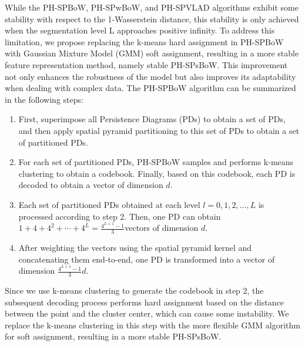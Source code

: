 \documentclass[5GeSdc,ASOC,numref,printGA,printHL,CASflow,nocrossmark,longtitle,PROOF]{/usr/local/texlive/iTemplates/01-Templates/01-Els-Jnl/01-Standard_Templates/V1/ELS_MDL5-V1-6}
\begin{document}
\begin{articlestyle}
While the PH-SPBoW, PH-SPwBoW, and PH-SPVLAD algorithms exhibit some stability with respect to the 1-Wasserstein distance, this stability is only achieved when the segmentation level L approaches positive infinity. To address this limitation, we propose replacing the k-means hard assignment in PH-SPBoW with Gaussian Mixture Model (GMM) soft assignment, resulting in a more stable feature representation method, namely stable PH-SPsBoW. This improvement not only enhances the robustness of the model but also improves its adaptability when dealing with complex data.
The PH-SPBoW algorithm can be summarized in the following steps:
\begin{enumerate}  
	\item[Step 1:~] First, superimpose all Persistence Diagrams (PDs) to obtain a set of PDs, and then apply spatial pyramid partitioning to this set of PDs to obtain a set of partitioned PDs.  
	
	\item[Step 2:~] For each set of partitioned PDs, PH-SPBoW samples and performs k-means clustering to obtain a codebook. Finally, based on this codebook, each PD is decoded to obtain a vector of dimension $ d $.  
	
	\item[Step 3:~] Each set of partitioned PDs obtained at each level $ l = 0, 1, 2, \ldots, L $ is processed according to step 2. Then, one PD can obtain $  1 + 4 + 4^2 +\cdots+ 4^L = \frac{4^{L+1} - 1}{3} $vectors of dimension $ d $.  
	
	\item[Step 4:~] After weighting the vectors using the spatial pyramid kernel and concatenating them end-to-end, one PD is transformed into a vector of dimension $\frac{4^{L+1} - 1}{3} d.$  
\end{enumerate}  

Since we use k-means clustering to generate the codebook in step 2, the subsequent decoding process performs hard assignment based on the distance between the point and the cluster center, which can cause some instability. We replace the k-means clustering in this step with the more flexible GMM algorithm for soft assignment, resulting in a more stable PH-SPsBoW.


\end{articlestyle}
\end{document}
